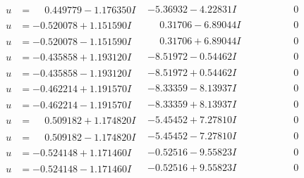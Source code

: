 \documentclass[1p]{elsarticle_modified}
\theoremstyle{definition}
\begin{document}
$$\begin{array}{c|c|c}
\begin{aligned}
u &= \phantom{-}0.449779 - 1.176350 I\end{aligned}
 & -5.36932 - 4.22831 I & \phantom{-0.000000 } 0 \\ \hline\begin{aligned}
u &= -0.520078 + 1.151590 I\end{aligned}
 & \phantom{-}0.31706 - 6.89044 I & \phantom{-0.000000 } 0 \\ \hline\begin{aligned}
u &= -0.520078 - 1.151590 I\end{aligned}
 & \phantom{-}0.31706 + 6.89044 I & \phantom{-0.000000 } 0 \\ \hline\begin{aligned}
u &= -0.435858 + 1.193120 I\end{aligned}
 & -8.51972 - 0.54462 I & \phantom{-0.000000 } 0 \\ \hline\begin{aligned}
u &= -0.435858 - 1.193120 I\end{aligned}
 & -8.51972 + 0.54462 I & \phantom{-0.000000 } 0 \\ \hline\begin{aligned}
u &= -0.462214 + 1.191570 I\end{aligned}
 & -8.33359 - 8.13937 I & \phantom{-0.000000 } 0 \\ \hline\begin{aligned}
u &= -0.462214 - 1.191570 I\end{aligned}
 & -8.33359 + 8.13937 I & \phantom{-0.000000 } 0 \\ \hline\begin{aligned}
u &= \phantom{-}0.509182 + 1.174820 I\end{aligned}
 & -5.45452 + 7.27810 I & \phantom{-0.000000 } 0 \\ \hline\begin{aligned}
u &= \phantom{-}0.509182 - 1.174820 I\end{aligned}
 & -5.45452 - 7.27810 I & \phantom{-0.000000 } 0 \\ \hline\begin{aligned}
u &= -0.524148 + 1.171460 I\end{aligned}
 & -0.52516 - 9.55823 I & \phantom{-0.000000 } 0 \\ \hline\begin{aligned}
u &= -0.524148 - 1.171460 I\end{aligned}
 & -0.52516 + 9.55823 I & \phantom{-0.000000 } 0 \\ \hline\begin{aligned}

\end{aligned}
\end{array}$$
\end{document}
